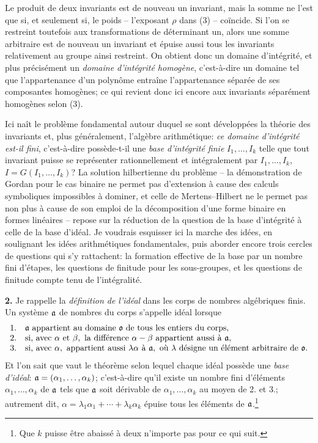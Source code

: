 Le produit de deux invariants est de nouveau un invariant, mais la somme ne l'est que si, et seulement si, le poids -- l'exposant $\rho$ dans (3) -- coïncide. Si l'on se restreint toutefois aux transformations de déterminant un, alors une somme arbitraire est de nouveau un invariant et épuise aussi tous les invariants relativement au groupe ainsi restreint. On obtient donc un domaine d’intégrité, et plus précisément un \emph{domaine d’intégrité homogène}, c'est-à-dire un domaine tel que l'appartenance d'un polynôme entraîne l'appartenance séparée de ses composantes homogènes; ce qui revient donc ici encore aux invariants séparément homogènes selon (3).

Ici naît le problème fondamental autour duquel se sont développées la théorie des invariants et, plus généralement, l'algèbre arithmétique: \emph{ce domaine d’intégrité est-il fini}, c'est-à-dire possède-t-il une \emph{base d'intégrité finie} $I_1,\ldots,I_k$ telle que tout invariant puisse se représenter rationnellement et intégralement par $I_1,\ldots,I_k$, $I=G(I_1,\ldots,I_k)$? La solution hilbertienne du problème -- la démonstration de Gordan pour le cas binaire ne permet pas d'extension à cause des calculs symboliques impossibles à dominer, et celle de Mertens--Hilbert ne le permet pas non plus à cause de son emploi de la décomposition d'une forme binaire en formes linéaires -- repose sur la réduction de la question de la base d'intégrité à celle de la base d'idéal. Je voudrais esquisser ici la marche des idées, en soulignant les idées arithmétiques fondamentales, puis aborder encore trois cercles de questions qui s'y rattachent: la formation effective de la base par un nombre fini d'étapes, les questions de finitude pour les sous-groupes, et les questions de finitude compte tenu de l'intégralité.

\textbf{2.} Je rappelle la \emph{définition de l'idéal} dans les corps de nombres algébriques finis. Un système $\mathfrak{a}$ de nombres du corps s'appelle idéal lorsque
\[
\begin{array}{ll}
1.& \mathfrak{a}\ \text{appartient au domaine }\mathfrak{o}\text{ de tous les entiers du corps},\\
2.& \text{si, avec }\alpha\text{ et }\beta,\text{ la différence }\alpha-\beta\text{ appartient aussi à }\mathfrak{a},\\
3.& \text{si, avec }\alpha,\text{ appartient aussi }\lambda\alpha\text{ à }\mathfrak{a},\text{ où }\lambda\text{ désigne un élément arbitraire de }\mathfrak{o}.
\end{array}
\]
Et l'on sait que vaut le théorème selon lequel chaque idéal possède une \emph{base d'idéal}: $\mathfrak{a}=(\alpha_1,\ldots,\alpha_k)$; c'est-à-dire qu'il existe un nombre fini d'éléments $\alpha_1,\ldots,\alpha_k$ de $\mathfrak{a}$ tels que $\mathfrak{a}$ soit dérivable de $\alpha_1,\ldots,\alpha_k$ au moyen de 2. et 3.; autrement dit, $\alpha=\lambda_1\alpha_1+\cdots+\lambda_k\alpha_k$ épuise tous les éléments de $\mathfrak{a}$.\footnote{Que $k$ puisse être abaissé à deux n'importe pas pour ce qui suit.}

